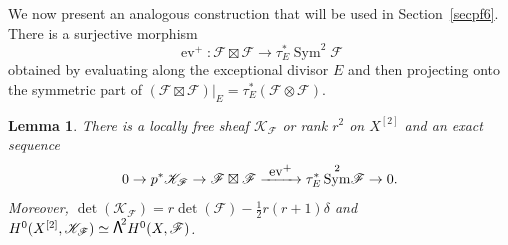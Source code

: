 \documentclass[JEP,XML,SOM,Unicode, NoEqCountersInSection,NoFloatCountersInSection]{cedram}
\let\mathcal\mathscr
\newcommand\To[1]{\mathchoice{\xrightarrow{\textstyle\kern4pt#1\kern3pt}}{\stackrel{#1}{\longrightarrow}}{}{}}
\newtheorem{lemm}{Lemma}[section]
\theoremstyle{definition}
\newcommand\cF{\mathcal{F}}
\newcommand\cK{\mathcal{K}}
\let\isom\simeq
\DeclareMathOperator{\ev}{ev}
\DeclareMathOperator{\Sym}{Sym}
\newcommand\bw[1]{{\hbox{\large$\mathsf{\Lambda}$}^{\!#1}}}
\begin{document}
We now present an analogous construction that will be used in Section~\ref{secpf6}. There is a surjective morphism
\[\label{eqmorph}
\ev^+\colon \cF \boxtimes\cF\to \tau_E^*\Sym^2\!\cF
\]
obtained by evaluating along the exceptional divisor $E$ and then projecting onto the symmetric part of
$(\cF \boxtimes\cF)\vert_{ E}=\tau_E^*( \cF\otimes\cF)$.

\begin{lemm}\label{ledescend}
There is a locally free sheaf $\cK_\cF$ or rank $r^2$ on $X^{[2]}$ and an exact sequence
\begin{equation}\label{eqcK}
0\to p^*\cK_\cF \to \cF\boxtimes\cF \To{\ev^+} \tau_E^*\Sym^2\!\cF\to 0.
\end{equation}
Moreover, $\det(\cK_\cF)=r\det(\cF)- \frac12 r(r+1)\delta $ and $H^0(X^{[2]},\cK_\cF)\isom \bw2H^0(X,\cF)$.
\end{lemm}
\end{document}

